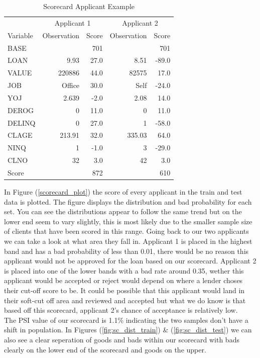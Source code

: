 \begin{table}[H]
\begin{center}
\begin{tabular}{lrrrr}
\toprule
& \multicolumn{2}{c}{Applicant 1} & \multicolumn{2}{c}{Applicant 2} \\
Variable & Observation & Score & Observation & Score \\
\midrule
BASE & & 701 & & 701 \\ 
LOAN & 9.93 & 27.0 & 8.51 & -89.0 \\
VALUE & 220886 & 44.0 & 82575 & 17.0 \\
JOB & Office & 30.0 & Self & -24.0 \\
YOJ & 2.639 & -2.0 & 2.08 & 14.0 \\
DEROG & 0 & 11.0 & 0 & 11.0 \\
DELINQ & 0 & 27.0 & 1 & -58.0 \\
CLAGE & 213.91 & 32.0 & 335.03 & 64.0\\
NINQ & 1 & -1.0 & 3 & -29.0 \\
CLNO & 32 & 3.0 & 42 & 3.0 \\
\midrule
Score &  & 872 &  & 610
\end{tabular}
\end{center}
\caption{Scorecard Applicant Example \label{table:app_example}}
\end{table}

In Figure (\ref{scorecard_plot}) the score of every applicant in the train and test data is plotted. The figure displays the distribution and bad probability for each set. You can see the distributions appear to follow the same trend but on the lower end seem to vary slightly, this is most likely due to the smaller sample size of clients that have been scored in this range. Going back to our two applicants we can take a look at what area they fall in. Applicant 1 is placed in the highest band and has a bad probability of less than 0.01, there would be no reason this applicant would not be approved for the loan based on our scorecard. Applicant 2 is placed into one of the lower bands with a bad rate around 0.35, wether this applicant would be accepted or reject would depend on where a lender choses their cut-off score to be. It could be possible that this applicant would land in their soft-cut off area and reviewed and accepted but what we do know is that based off this scorecard, applicant 2's chance of acceptance is relatively low. \\

The PSI value of our scorecard is 1.1\% indicating the two samples don't have a shift in population. In Figures (\ref{fig:sc_dist_train}) \& (\ref{fig:sc_dist_test}) we can also see a clear seperation of goods and bads within our scorecard with bads clearly on the lower end of the scorecard and goods on the upper. 


